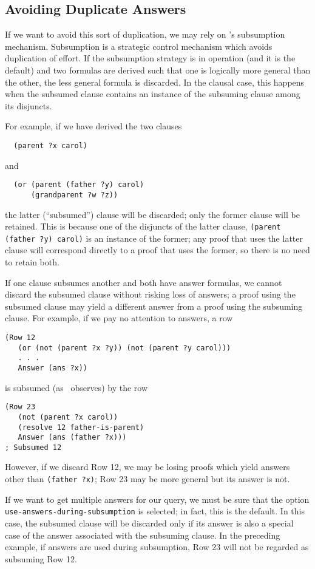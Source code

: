 \subsection{Avoiding Duplicate Answers}
\label{subsec-avoiding-duplicate-answers}
\label{subsec-subsumption}

If we want to avoid this sort of duplication, we may rely on
\snark\/'s subsumption mechanism.  Subsumption is a strategic control
mechanism which avoids duplication of effort.  If the subsumption
strategy is in operation (and it is the default) and two formulas are
derived such that one is logically more general than the other, the
less general formula is discarded.  In the clausal case, this happens
when the subsumed clause contains an instance of the subsuming clause
among its disjuncts.

For example, if we have derived the two clauses
\begin{verbatim}
  (parent ?x carol)
\end{verbatim}
and
\begin{verbatim}
  (or (parent (father ?y) carol)
      (grandparent ?w ?z))
\end{verbatim}
the latter (``subsumed'') clause will be discarded; only the former
clause will be retained.  This is because one of the disjuncts of the
latter clause, \verb|(parent (father ?y) carol)| is an instance of the
former; any proof that uses the latter clause will correspond directly
to a proof that uses the former, so there is no need to retain both.

If one clause subsumes another and both have answer formulas, we cannot
discard the subsumed clause without risking loss of answers; a proof
using the subsumed clause may yield a different answer from a proof
using the subsuming clause.
For example, if we pay no attention to answers, a row
\begin{verbatim}
(Row 12
   (or (not (parent ?x ?y)) (not (parent ?y carol)))
   . . .
   Answer (ans ?x))
\end{verbatim}
is subsumed (as \snark\  observes) by the row
\begin{verbatim}
(Row 23
   (not (parent ?x carol))
   (resolve 12 father-is-parent)
   Answer (ans (father ?x)))
; Subsumed 12
\end{verbatim}
However, if we discard Row 12, we may be losing proofs which yield
answers other than \verb'(father ?x)';  Row 23 may be more general but
its answer is not.

If we want to get multiple answers for our query, we must be sure that
the option {\tt use-answers-during-subsumption} is selected; in fact,
this is the default.  In this case, the subsumed clause will be
discarded only if its answer is also a special case of the answer
associated with the subsuming clause.  In the preceding example, if
answers are used during subsumption, Row 23 will not be regarded as
subsuming Row 12.


